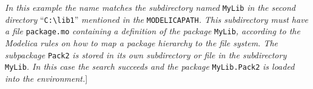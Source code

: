 \emph{In this example the name matches the subdirectory named} \lstinline[basicstyle=\ttfamily]!MyLib!
\emph{in the second directory} ``\lstinline[basicstyle=\ttfamily]!C:\lib1!''
\emph{mentioned in the} \lstinline[basicstyle=\ttfamily]!MODELICAPATH!\emph{. This subdirectory must have
a file} \lstinline[basicstyle=\ttfamily]!package.mo! \emph{containing a definition of the package}
\lstinline[basicstyle=\ttfamily]!MyLib!\emph{, according to the Modelica rules on how to map a package
hierarchy to the file system. The subpackage} \lstinline[basicstyle=\ttfamily]!Pack2! \emph{is stored in
its own subdirectory or file in the subdirectory} \lstinline[basicstyle=\ttfamily]!MyLib!\emph{. In this
case the search succeeds and the package} \lstinline[basicstyle=\ttfamily]!MyLib.Pack2! \emph{is loaded
into the environment.}{]}
